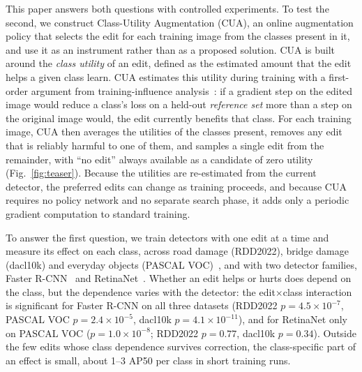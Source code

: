 \documentclass[conference]{IEEEtran}
\begin{document}
This paper answers both questions with controlled experiments. To test the second, we construct Class-Utility Augmentation (CUA), an online augmentation policy that selects the edit for each training image from the classes present in it, and use it as an instrument rather than as a proposed solution. CUA is built around the \emph{class utility} of an edit, defined as the estimated amount that the edit helps a given class learn. CUA estimates this utility during training with a first-order argument from training-influence analysis~\cite{pruthi2020tracin}: if a gradient step on the edited image would reduce a class's loss on a held-out \emph{reference set} more than a step on the original image would, the edit currently benefits that class. For each training image, CUA then averages the utilities of the classes present, removes any edit that is reliably harmful to one of them, and samples a single edit from the remainder, with ``no edit'' always available as a candidate of zero utility (Fig.~\ref{fig:teaser}). Because the utilities are re-estimated from the current detector, the preferred edits can change as training proceeds, and because CUA requires no policy network and no separate search phase, it adds only a periodic gradient computation to standard training.

To answer the first question, we train detectors with one edit at a time and measure its effect on each class, across road damage (RDD2022), bridge damage (dacl10k) and everyday objects (PASCAL VOC)~\cite{everingham2010voc}, and with two detector families, Faster R-CNN~\cite{ren2017faster} and RetinaNet~\cite{lin2017focal}. Whether an edit helps or hurts does depend on the class, but the dependence varies with the detector: the edit$\times$class interaction is significant for Faster R-CNN on all three datasets (RDD2022 $p=4.5\times10^{-7}$, PASCAL VOC $p=2.4\times10^{-5}$, dacl10k $p=4.1\times10^{-11}$), and for RetinaNet only on PASCAL VOC ($p=1.0\times10^{-8}$; RDD2022 $p=0.77$, dacl10k $p=0.34$). Outside the few edits whose class dependence survives correction, the class-specific part of an effect is small, about 1--3 AP50 per class in short training runs.
\end{document}
